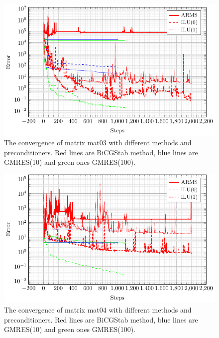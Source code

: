 \documentclass{article}
\begin{document}
	\begin{figure}
		\centering
		\includegraphics[width=\textwidth]{mat03_error.pdf}
		\caption{The convergence of matrix mat03 with different methods and preconditioners. Red lines are BiCGStab method, blue lines are GMRES(10) and green ones GMRES(100).}
			\label{fig:mat03error} 
	\end{figure}
		
	\begin{figure}
		\centering
		\includegraphics[width=\textwidth]{mat04_error.pdf}
		\caption{The convergence of matrix mat04 with different methods and preconditioners. Red lines are BiCGStab method, blue lines are GMRES(10) and green ones GMRES(100).}
			\label{fig:mat04error} 
	\end{figure}
	
\end{document}
